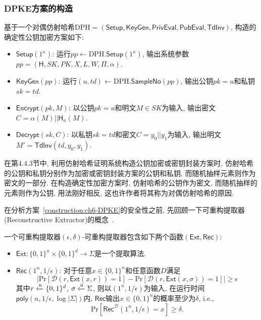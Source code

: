 \subsubsection{DPKE方案的构造}
\begin{construction}[基于对偶仿射哈希的DPKE方案]\label{construction:ch6-DPKE}
基于一个对偶仿射哈希$\text{DPH} = (\mathsf{Setup}, \mathsf{KeyGen}, \mathsf{PrivEval}, \mathsf{PubEval}, \mathsf{TdInv})$, 构造的确定性公钥加密方案如下:
\begin{itemize}
\item $\mathsf{Setup}(1^\kappa)$: 运行$pp \leftarrow \text{DPH}.\mathsf{Setup}(1^\kappa)$, 输出系统参数$pp = (\mathsf{H}, SK, PK, X, L, W, \Pi, \alpha)$.

\item $\mathsf{KeyGen}(pp)$: 运行$(u, td) \leftarrow \text{DPH}.\mathsf{SampleNo}(pp)$, 输出公钥$pk = u$和私钥$sk = td$. 
  
\item $\mathsf{Encrypt}(pk, M)$: 以公钥$pk = u$和明文$M \in SK$为输入, 输出密文$C = \alpha(M)||\mathsf{H}_u(M)$.

\item $\mathsf{Decrypt}(sk, C)$: 以私钥$sk = td$和密文$C = y_0||y_1$为输入, 输出明文$M' = \mathsf{TdInv}(td, y_0, y_1)$. 
\end{itemize}
\end{construction}

\begin{note}
在第4.4.3节中, 利用仿射哈希证明系统构造公钥加密或密钥封装方案时, 仿射哈希的公钥和私钥分别作为加密或密钥封装方案的公钥和私钥, 而随机抽样元素则作为密文的一部分. 在构造确定性加密方案时, 仿射哈希的公钥作为密文, 而随机抽样的元素则作为公钥, 用法刚好相反, 这也许作者将其称为对偶仿射哈希的原因.
\end{note}

在分析方案~\ref{construction:ch6-DPKE}的安全性之前, 先回顾一下可重构提取器(Reconstructive Extractor)的概念~\cite{Trevisan-ACM-2001}.
\begin{definition}[可重构提取器]
一个可重构提取器$(\epsilon, \delta)$-可重构提取器包含如下两个函数$(\mathsf{Ext}, \mathsf{Rec})$:
\begin{itemize}
\item $\mathsf{Ext}: \{0, 1\}^n \times \{0, 1\}^d \rightarrow \Sigma$是一个提取算法. 

\item $\mathsf{Rec}(1^n, 1/\epsilon)$: 对于任意$x \in \{0, 1\}^n$和任意函数$D$满足
\[
\left|\text{Pr}[\mathcal{D}(r, \mathsf{Ext}(x, r)) = 1] - \text{Pr}[\mathcal{D}(r, \mathsf{Ext}(x, \sigma)) = 1]\right| \geq \epsilon
\]
其中$r \xleftarrow{\textup{\tiny R}} \{0, 1\}^d$, $\sigma \xleftarrow{\textup{\tiny R}} \Sigma$, 则以$(1^n, 1/\epsilon)$为输入, 在运行时间$\mathsf{poly}(n, 1/\epsilon, \log |\Sigma|)$内, $\mathsf{Rec}$输出$x \in \{0, 1\}^n$的概率至少为$\delta$, i.e.,
\[
\text{Pr}[\mathsf{Rec}^{\mathcal{D}}(1^n, 1/\epsilon) = x] \geq \delta.
\]
\end{itemize}
\end{definition} 

